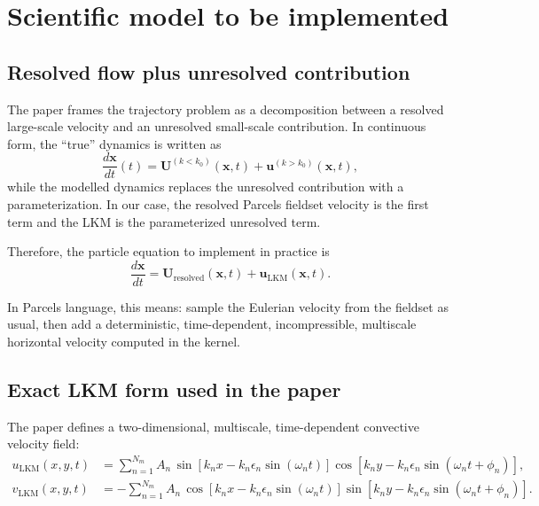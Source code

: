 \documentclass[11pt,a4paper]{article}
\begin{document}
	\section{Scientific model to be implemented}
	
	\subsection{Resolved flow plus unresolved contribution}
	
	The paper frames the trajectory problem as a decomposition between a resolved large-scale velocity and an unresolved small-scale contribution. In continuous form, the ``true'' dynamics is written as
	\begin{equation}
		\frac{d\mathbf{x}}{dt}(t) = \mathbf{U}^{(k<k_0)}(\mathbf{x},t) + \mathbf{u}^{(k>k_0)}(\mathbf{x},t),
	\end{equation}
	while the modelled dynamics replaces the unresolved contribution with a parameterization. In our case, the resolved Parcels fieldset velocity is the first term and the LKM is the parameterized unresolved term.
	
	Therefore, the particle equation to implement in practice is
	\begin{equation}
		\frac{d\mathbf{x}}{dt} = \mathbf{U}_{\mathrm{resolved}}(\mathbf{x},t) + \mathbf{u}_{\mathrm{LKM}}(\mathbf{x},t).
	\end{equation}
	
	In Parcels language, this means: sample the Eulerian velocity from the fieldset as usual, then add a deterministic, time-dependent, incompressible, multiscale horizontal velocity computed in the kernel.
	
	\subsection{Exact LKM form used in the paper}
	
	The paper defines a two-dimensional, multiscale, time-dependent convective velocity field:
	\begin{align}
		u_{\mathrm{LKM}}(x,y,t) &= \sum_{n=1}^{N_m} A_n\,\sin\!\left[k_n x - k_n \epsilon_n \sin(\omega_n t)\right]
		\cos\!\left[k_n y - k_n \epsilon_n \sin(\omega_n t + \phi_n)\right], \\
		v_{\mathrm{LKM}}(x,y,t) &= -\sum_{n=1}^{N_m} A_n\,\cos\!\left[k_n x - k_n \epsilon_n \sin(\omega_n t)\right]
		\sin\!\left[k_n y - k_n \epsilon_n \sin(\omega_n t + \phi_n)\right].
	\end{align}
	
\end{document}
